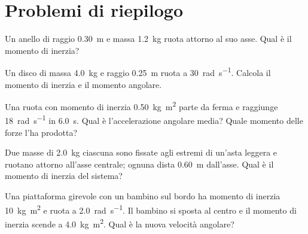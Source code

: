 \section{Problemi di riepilogo}

\begin{esercizio}
Un anello di raggio \SI{0,30}{\metre} e massa \SI{1,2}{\kilogram} ruota attorno al suo asse. Qual è il momento di inerzia?\\
\end{esercizio}

\begin{esercizio}
Un disco di massa \SI{4,0}{\kilogram} e raggio \SI{0,25}{\metre} ruota a \SI{30}{\radian\per\second}. Calcola il momento di inerzia e il momento angolare.\\
\end{esercizio}

\begin{esercizio}
Una ruota con momento di inerzia \SI{0,50}{\kilogram\metre\squared} parte da ferma e raggiunge \SI{18}{\radian\per\second} in \SI{6,0}{\second}. Qual è l'accelerazione angolare media? Quale momento delle forze l'ha prodotta?\\
\end{esercizio}

\begin{esercizio}
Due masse di \SI{2,0}{\kilogram} ciascuna sono fissate agli estremi di un'asta leggera e ruotano attorno all'asse centrale; ognuna dista \SI{0,60}{\metre} dall'asse. Qual è il momento di inerzia del sistema?\\
\end{esercizio}

\begin{esercizio}
Una piattaforma girevole con un bambino sul bordo ha momento di inerzia \SI{10}{\kilogram\metre\squared} e ruota a \SI{2,0}{\radian\per\second}. Il bambino si sposta al centro e il momento di inerzia scende a \SI{4,0}{\kilogram\metre\squared}. Qual è la nuova velocità angolare?\\
\end{esercizio}

